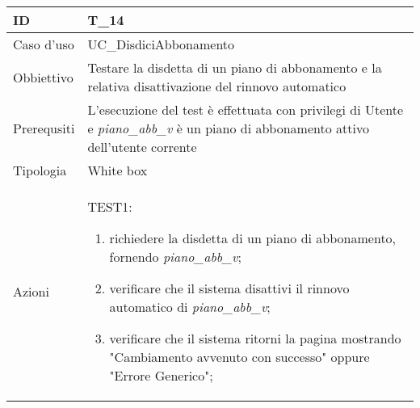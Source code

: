 \begin{table}[hb]
    \centering
    \begin{tabular}{ |p{2cm}|p{10cm}|  }
        \hline
        ID          & T\_14                                                                                                                                   \\\hline
        Caso d'uso  & UC\_DisdiciAbbonamento                                                                                                                  \\\hline
        Obbiettivo  & Testare la disdetta di un piano di abbonamento e la relativa disattivazione del rinnovo automatico                                      \\\hline
        Prerequsiti & L'esecuzione del test è effettuata con privilegi di Utente e \emph{piano\_abb\_v} è un piano di abbonamento attivo dell'utente corrente \\\hline
        Tipologia   & White box                                                                                                                               \\\hline
        Azioni      &
        TEST1:
        \begin{enumerate}[nosep, topsep=0pt]
            \item richiedere la disdetta di un piano di abbonamento, fornendo \emph{piano\_abb\_v};
            \item verificare che il sistema disattivi il rinnovo automatico di \emph{piano\_abb\_v};
            \item verificare che il sistema ritorni la pagina mostrando "Cambiamento avvenuto con successo" oppure "Errore Generico";
        \end{enumerate}
        \\\hline
    \end{tabular}
\end{table}

